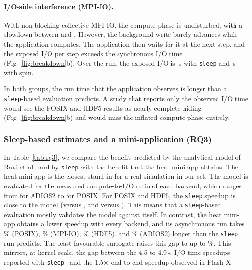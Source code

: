 \paragraph{I/O-side interference (MPI-IO).} With non-blocking collective
MPI-IO, the compute phase is undisturbed, with a slowdown between
\SlowMpiioHeat and \SlowMpiioHalo. However, the background write barely
advances while the application computes. The application then waits for
it at the next step, and the exposed I/O per step exceeds the synchronous
I/O time (Fig.~\ref{fig:breakdown}b). Over the run, the exposed I/O is
\DcexposecMpiioSleep\,s with \texttt{sleep} and \DcexposecMpiioSpin\,s with
spin.

In both groups, the run time that the application observes is longer than a
\texttt{sleep}-based evaluation predicts. A study that reports only the
observed I/O time would see the POSIX and HDF5 results as nearly complete
hiding (Fig.~\ref{fig:breakdown}b) and would miss the inflated compute phase
entirely.


\subsubsection{Sleep-based estimates and a mini-application (RQ3)}
\label{sec:rq3}

In Table~\ref{tab:rq3}, we compare the benefit predicted by the analytical
model of Ravi et al.\ and by \texttt{sleep} with the benefit that the heat
mini-app obtains. The heat mini-app is the closest stand-in for a real
simulation in our set. The model is evaluated for the measured
compute-to-I/O ratio of each backend, which ranges from \RatioeffAdios for
ADIOS2 to \RatioeffPosix for POSIX. For POSIX and HDF5, the \texttt{sleep}
speedup is close to the model (\SpPosixSleep versus \ModelPosix, and
\SpHdfSleep versus \ModelHdf). This means that a \texttt{sleep}-based
evaluation mostly validates the model against itself. In contrast, the heat
mini-app obtains a lower speedup with every backend, and its asynchronous run
takes \ExcpctPosixHeat\% (POSIX), \ExcpctMpiioHeat\% (MPI-IO),
\ExcpctHdfHeat\% (HDF5), and \ExcpctAdiosHeat\% (ADIOS2) longer than the
\texttt{sleep} run predicts. The least favourable surrogate raises this gap
to up to \ExcmaxpctHdf\%. This mirrors, at kernel scale, the gap between the
4.5 to 4.9$\times$ I/O-time speedups reported with
\texttt{sleep}~\cite{tang2022async} and the 1.5$\times$ end-to-end speedup
observed in Flash-X~\cite{jain2022flashx}.

